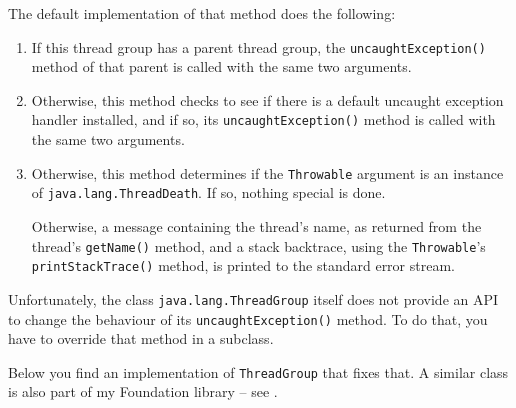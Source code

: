\documentclass[11pt,a4paper, titlepage, parskip=half, headsepline, footsepline, cleardoublepage=current, headheight=1cm]{scrbook}
\begin{document}
The default implementation of that method does the following:
\begin{enumerate}
\item{If this thread group has a parent thread group, the \lstinline|uncaughtException()| method of that parent is called with the same two arguments.}
\item{Otherwise, this method checks to see if there is a default uncaught exception handler installed, and if so, its \lstinline|uncaughtException()| method is called with the same two arguments.}
\item{Otherwise, this method determines if the \lstinline|Throwable| argument is an instance of \lstinline|java.lang.ThreadDeath|. If so, nothing special is done.

Otherwise, a message containing the thread's name, as returned from the thread's \lstinline|getName()| method, and a stack backtrace, using the \lstinline|Throwable|'s \lstinline|printStackTrace()| method, is printed to the standard error stream.}
\end{enumerate}

Unfortunately, the class \lstinline|java.lang.ThreadGroup| itself does not provide an API to change the behaviour of its \lstinline|uncaughtException()| method. To do that, you have to override that method in a subclass.

Below you find an implementation of \lstinline|ThreadGroup| that fixes that. A similar class is also part of my Foundation library – see \autocite{TQUADRAT_ORG_FOUNDATION_BASE, TQUADRAT_ORG_FOUNDATION_THREADGROUP}.
\end{document}
